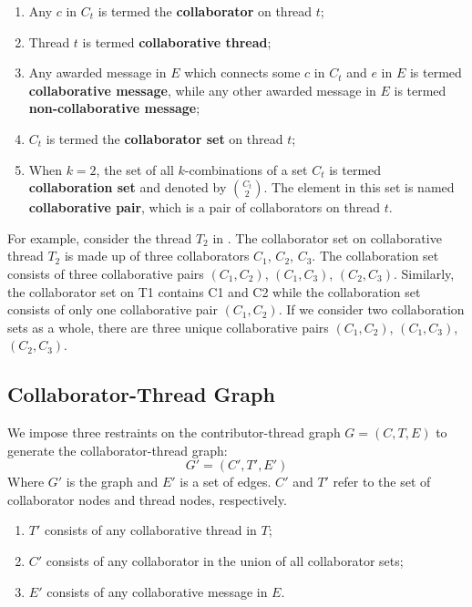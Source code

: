 \begin{enumerate}
	\item Any \(c\) in \(C_{t}\) is termed the \textbf{collaborator} on thread \(t\); \\
	\item Thread \(t\) is termed \textbf{collaborative thread}; \\
	\item Any awarded message in \(E\) which connects some \(c\) in \(C_{t}\) and \(e\) in \(E\) is termed \textbf{collaborative message}, while any other awarded message in \(E\) is termed \textbf{non-collaborative message}; \\
	\item \(C_{t}\) is termed the \textbf{collaborator set} on thread \(t\); \\
	\item When \(k = 2\), the set of all \(k\)-combinations of a set \(C_{t}\) is termed \textbf{collaboration set} and denoted by \(\binom{C_{t}}{2}\). The element in this set is named \textbf{collaborative pair}, which is a pair of collaborators on thread \(t\).

\end{enumerate}

For example, consider the thread \(T_{2}\) in . The collaborator set on collaborative thread \(T_{2}\) is made up of three collaborators \(C_{1}\), \(C_{2}\), \(C_{3}\). The collaboration set consists of three collaborative pairs \((C_{1}, C_{2})\), \((C_{1}, C_{3})\), \((C_{2}, C_{3})\). Similarly, the collaborator set on T1 contains C1 and C2 while the collaboration set consists of only one collaborative pair \((C_{1}, C_{2})\). If we consider two collaboration sets as a whole, there are three unique collaborative pairs \((C_{1}, C_{2})\), \((C_{1}, C_{3})\), \((C_{2}, C_{3})\).

\subsection{Collaborator-Thread Graph}

We impose three restraints on the contributor-thread graph \(G=(C, T, E)\) to generate the collaborator-thread graph:
\[G'=(C', T', E')\]
Where \(G'\) is the graph and \(E'\) is a set of edges. \(C'\) and \(T'\) refer to the set of collaborator nodes and thread nodes, respectively.

\begin{enumerate}
	\item \(T'\) consists of any collaborative thread in \(T\); \\
	\item \(C'\) consists of any collaborator in the union of all collaborator sets; \\
	\item \(E'\) consists of any collaborative message in \(E\).
\end{enumerate}	
	
